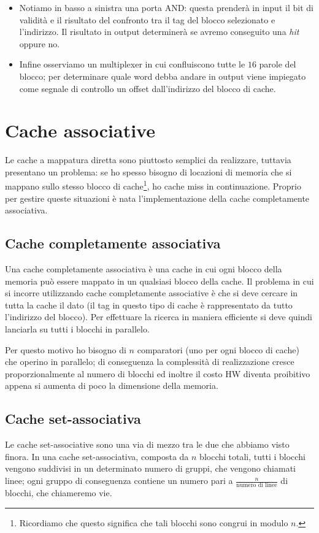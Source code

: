 \documentclass[class=book, crop=false, oneside]{standalone}
\begin{document}
\begin{itemize}
	\item Notiamo in basso a sinistra una porta AND: questa prenderà in input il bit di validità e il risultato del confronto tra il tag del blocco selezionato e l'indirizzo. Il risultato in output determinerà se avremo conseguito una \emph{hit} oppure no.
	\item Infine osserviamo un multiplexer in cui confluiscono tutte le \(16\) parole del blocco; per determinare quale word debba andare in output viene impiegato come segnale di controllo un offset dall'indirizzo del blocco di cache.
\end{itemize}

\section{Cache associative}
Le cache a mappatura diretta sono piuttosto semplici da realizzare, tuttavia presentano un problema: se ho spesso bisogno di locazioni di memoria che si mappano sullo stesso blocco di cache\footnote{Ricordiamo che questo significa che tali blocchi sono congrui in modulo \(n\).}, ho cache miss in continuazione.
Proprio per gestire queste situazioni è nata l'implementazione della cache completamente associativa.

\subsection{Cache completamente associativa}
Una cache completamente associativa è una cache in cui ogni blocco della memoria può essere mappato in un qualsiasi blocco della cache. Il problema in cui si incorre utilizzando cache completamente associative è che si deve cercare in tutta la cache il dato (il tag in questo tipo di cache è rappresentato da tutto l’indirizzo del blocco). Per effettuare la ricerca in maniera efficiente si deve quindi lanciarla su tutti i blocchi in parallelo.

Per questo motivo ho bisogno di $n$ comparatori (uno per ogni blocco di cache) che operino in parallelo; di conseguenza la complessità di realizzazione cresce proporzionalmente al numero di blocchi ed inoltre il costo HW diventa proibitivo appena si aumenta di poco la dimensione della memoria.

\subsection{Cache set-associativa}
Le cache set-associative sono una via di mezzo tra le due che abbiamo visto finora.
In una cache set-associativa, composta da $n$ blocchi totali, tutti i blocchi vengono suddivisi in un determinato numero di gruppi, che vengono chiamati linee; ogni gruppo di conseguenza contiene un numero pari a \(\frac{n}{\textrm{numero di linee}}\) di blocchi, che chiameremo vie.
\end{document}
